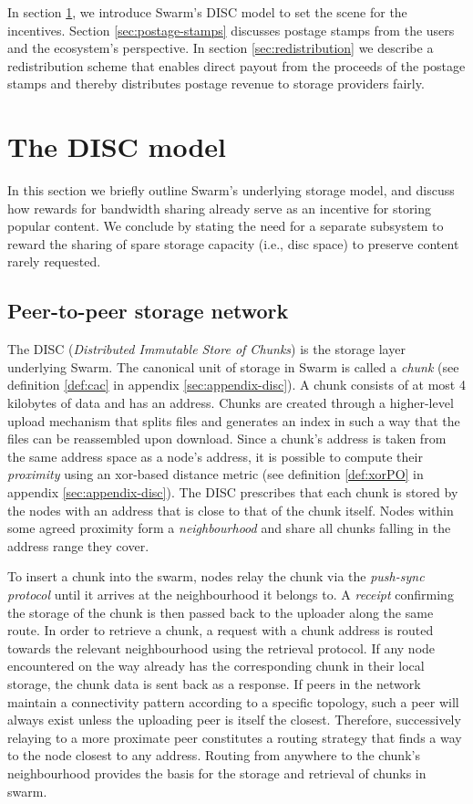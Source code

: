 In section \ref{sec:disc}, we introduce Swarm's DISC model to set the scene for the incentives. Section \ref{sec:postage-stamps} discusses postage stamps from the  users and the ecosystem's perspective.  In section \ref{sec:redistribution} we describe a redistribution scheme that enables direct payout from the proceeds of the postage stamps and thereby distributes postage revenue  to storage providers fairly. 

\section{The DISC model}\label{sec:disc}

In this section we briefly outline Swarm's underlying storage model, and discuss how rewards for bandwidth sharing already serve as an incentive for storing popular content. We conclude by stating the need for a separate subsystem to reward the sharing of spare storage capacity (i.e., disc space) to preserve content rarely requested.

\subsection{Peer-to-peer storage network}\label{sec:p2p}

The DISC (\/\emph{Distributed Immutable Store of Chunks}) is the storage layer underlying Swarm. 
The canonical unit of storage in Swarm is called a \emph{chunk} (see definition \ref{def:cac} in appendix \ref{sec:appendix-disc}). A chunk consists of at most 4 kilobytes of data and has an address. Chunks are created through a higher-level upload mechanism that splits files and generates an index in such a way that the files can be reassembled upon download. Since a chunk’s address is taken from the same address space as a node’s address, it is possible to compute their \emph{proximity} using an xor-based distance metric (see definition \ref{def:xorPO} in appendix \ref{sec:appendix-disc}). The DISC prescribes that each chunk is stored by the nodes with an address that is close to that of the chunk itself. Nodes within some agreed proximity form a \emph{neighbourhood} and share all chunks falling in the address range they cover.

To insert a chunk into the swarm, nodes relay the chunk via the \emph{push-sync protocol} until it arrives at the neighbourhood it belongs to. A \emph{receipt} confirming the storage of the chunk is then passed back  to the uploader along the same route. In order to retrieve a chunk, a request with a chunk address is routed towards the relevant neighbourhood using the retrieval protocol. If any node encountered on the way already has the corresponding chunk in their local storage, the chunk data is sent back as a response. If peers in  the network maintain a connectivity pattern according to a specific topology, such a peer will always exist unless the uploading peer is itself the closest. Therefore, successively relaying to a more proximate peer constitutes a routing strategy that finds a way to the node closest to any address.  Routing from anywhere to the  chunk's neighbourhood provides the basis for the storage and retrieval  of chunks in swarm. 

